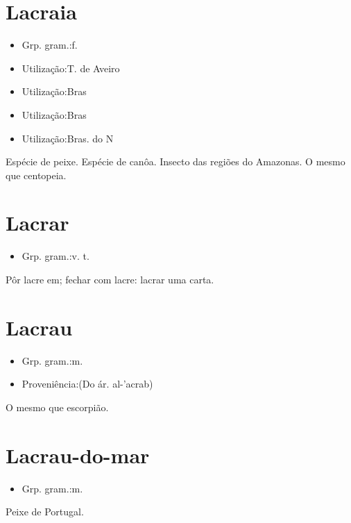 \section{Lacraia}
\begin{itemize}
\item {Grp. gram.:f.}
\end{itemize}
\begin{itemize}
\item {Utilização:T. de Aveiro}
\end{itemize}
\begin{itemize}
\item {Utilização:Bras}
\end{itemize}
\begin{itemize}
\item {Utilização:Bras}
\end{itemize}
\begin{itemize}
\item {Utilização:Bras. do N}
\end{itemize}
Espécie de peixe.
Espécie de canôa.
Insecto das regiões do Amazonas.
O mesmo que \textunderscore centopeia\textunderscore .
\section{Lacrar}
\begin{itemize}
\item {Grp. gram.:v. t.}
\end{itemize}
Pôr lacre em; fechar com lacre: \textunderscore lacrar uma carta\textunderscore .
\section{Lacrau}
\begin{itemize}
\item {Grp. gram.:m.}
\end{itemize}
\begin{itemize}
\item {Proveniência:(Do ár. \textunderscore al-'acrab\textunderscore )}
\end{itemize}
O mesmo que \textunderscore escorpião\textunderscore .
\section{Lacrau-do-mar}
\begin{itemize}
\item {Grp. gram.:m.}
\end{itemize}
Peixe de Portugal.
